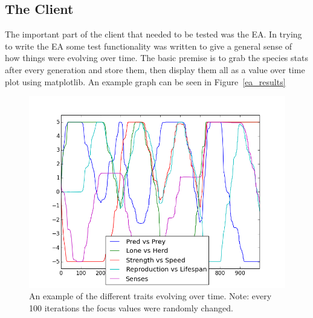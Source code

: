 \subsection{The Client}
The important part of the client that needed to be tested was the EA. In trying to write the EA some test functionality was written to give a general sense of how things were evolving over time. The basic premise is to grab the species stats after every generation and store them, then display them all as a value over time plot using matplotlib. An example graph can be seen in Figure~\ref{ea_results}

\begin{figure}
\centering
\includegraphics[width=\textwidth]{ea_results}
\caption{An example of the different traits evolving over time. Note: every 100 iterations the focus values were randomly changed.}
\end{figure}
